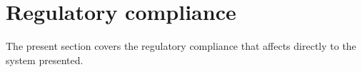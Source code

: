 \chapter {Regulatory compliance}

The present section covers the regulatory compliance that affects directly to the system presented. 






	
